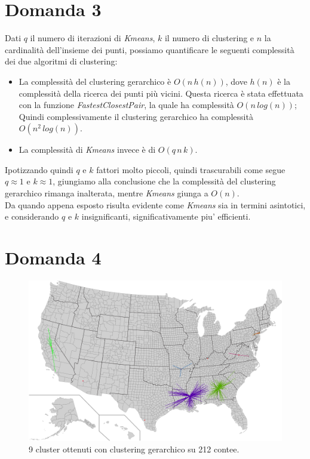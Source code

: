 \documentclass{article}
\begin{document}
\section*{Domanda 3}
Dati $q$ il numero di iterazioni di \textit{Kmeans}, $k$ il numero di clustering e $n$ la cardinalità dell'insieme dei punti, possiamo quantificare le seguenti complessità dei due algoritmi di clustering:
\begin{itemize}
	\item La complessità del clustering gerarchico è $O(n\,h(n))$, dove $h(n)$ è la complessità della ricerca dei punti più vicini.
	      Questa ricerca è stata effettuata con la funzione \textit{FastestClosestPair}, la quale ha complessità $O(n\,log(n))$;
	      Quindi complessivamente il clustering gerarchico ha complessità $O(n^2\,log(n))$.
	\item La complessità di \textit{Kmeans} invece è di $O(q\,n\,k)$. 
\end{itemize}

\noindent Ipotizzando quindi $q$ e $k$ fattori molto piccoli, quindi trascurabili come segue $q \approx 1$ e $k \approx 1$, giungiamo alla conclusione che 
la complessità del clustering gerarchico rimanga inalterata, mentre \textit{Kmeans} giunga a $O(n)$.\\
Da quando appena esposto risulta evidente come \textit{Kmeans} sia in termini asintotici, e considerando $q$ e $k$ insignificanti, significativamente piu' efficienti.

\section*{Domanda 4}
\begin{center}
	\begin{figure}[H]
		\hspace*{1.5cm}\includegraphics[width=0.8\linewidth, valign=t]{figures/Domanda4}
		\caption*{9 cluster ottenuti con clustering gerarchico su 212 contee.}
										
	\end{figure}
\end{center}
\end{document}

